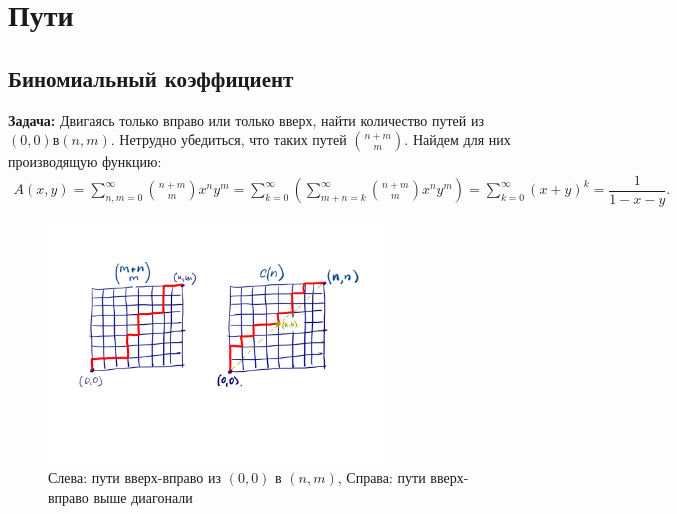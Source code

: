 \documentclass[a4paper,14pt]{article}
\begin{document}
\section*{Пути}
\subsection*{Биномиальный коэффициент}
\textbf{Задача:} Двигаясь только вправо или только вверх,
найти количество путей из $\left(0, 0\right) в \left(n, m\right)$.
Нетрудно убедиться, что таких путей $\binom{n + m}{m}$.
Найдем для них производящую функцию:
\begin{align*}
	A(x, y) =\sum_{n,m=0}^{\infty}\binom{n + m}{m}x^ny^m = 
\sum_{k = 0}^{\infty}\left( \sum_{m+n=k}^{\infty} \binom{n + m}{m}x^ny^m \right) =
\sum_{k=0}^{\infty} \left(x + y\right)^k = \dfrac{1}{1 - x - y} 
.\end{align*}
\begin{figure}[htpb]
	\centering
	\includegraphics[width=0.8\textwidth]{images/path1}
	\caption{Слева: пути вверх-вправо из $(0, 0)$ в $(n,m)$, Справа:
	пути вверх-вправо выше диагонали}
	\label{fig:}
\end{figure}
\end{document}
